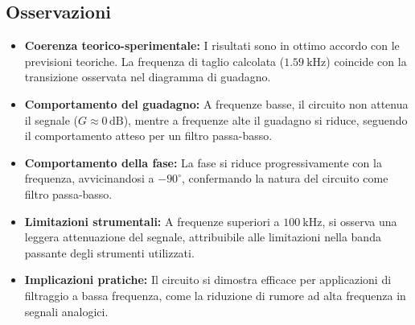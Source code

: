 \documentclass[a4paper,10pt]{article}
\begin{document}
\subsection{Osservazioni}
\begin{itemize}
    \item \textbf{Coerenza teorico-sperimentale:} I risultati sono in ottimo accordo con le previsioni teoriche. La frequenza di taglio calcolata (\(\SI{1.59}{\kilo\hertz}\)) coincide con la transizione osservata nel diagramma di guadagno.
    \item \textbf{Comportamento del guadagno:} A frequenze basse, il circuito non attenua il segnale (\(G \approx 0 \, \si{\deci\bel}\)), mentre a frequenze alte il guadagno si riduce, seguendo il comportamento atteso per un filtro passa-basso.
    \item \textbf{Comportamento della fase:} La fase si riduce progressivamente con la frequenza, avvicinandosi a \(-90^\circ\), confermando la natura del circuito come filtro passa-basso.
    \item \textbf{Limitazioni strumentali:} A frequenze superiori a \(\SI{100}{\kilo\hertz}\), si osserva una leggera attenuazione del segnale, attribuibile alle limitazioni nella banda passante degli strumenti utilizzati.
    \item \textbf{Implicazioni pratiche:} Il circuito si dimostra efficace per applicazioni di filtraggio a bassa frequenza, come la riduzione di rumore ad alta frequenza in segnali analogici.
\end{itemize}

\end{document}
